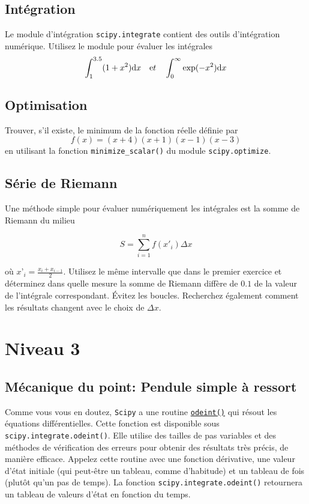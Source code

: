 \documentclass[a4paper]{article}
\begin{document}
\subsection{Intégration}
 Le module d’intégration {\tt scipy.integrate} contient des outils d’intégration numérique. Utilisez le module pour évaluer les intégrales
 \[\int_1^{3.5}(1+x^2){\mbox d}x \quad {\mbox et}\quad \int_0^\infty \exp(-x^2) {\mbox d}x \]
 \subsection{Optimisation}
 Trouver, s'il existe, le minimum de la fonction réelle définie par
 \[ f(x)=(x+4)(x+1)(x-1)(x-3)\]
en utilisant la fonction {\tt minimize\_scalar()} du module {\tt scipy.optimize}.
\subsection{Série de Riemann}
Une méthode simple pour évaluer numériquement les intégrales est la somme de Riemann du milieu

\[ S=\sum_{i=1}^nf(x'_i)\Delta x \]

où $x’_i = \frac{x_i + x_{i-1}}2$. Utilisez le même intervalle que dans le premier exercice et déterminez dans quelle mesure la somme de Riemann diffère de $0.1$ de la valeur de l'intégrale correspondant. Évitez les boucles. Recherchez également comment les résultats changent avec le choix de $\Delta x$.
\section{Niveau 3}
\subsection{Mécanique du point: Pendule simple à ressort}
Comme vous vous en doutez, {\tt Scipy} a une routine \href{https://docs.scipy.org/doc/scipy/reference/generated/scipy.integrate.odeint.html} {\tt odeint()}  qui résout les équations différentielles. Cette fonction est disponible sous {\tt scipy.integrate.odeint()}. Elle utilise des tailles de pas variables et des méthodes de vérification des erreurs pour obtenir des résultats très précis, de manière efficace. Appelez cette routine avec une fonction dérivative, une valeur d'état initiale (qui peut-être un tableau, comme d'habitude) et un tableau de fois (plutôt qu'un pas de temps). La fonction {\tt scipy.integrate.odeint()} retournera un tableau de valeurs d'état en fonction du temps.
\end{document}

